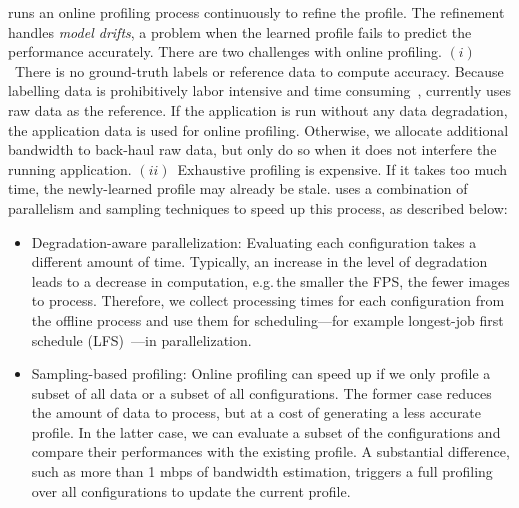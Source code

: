 
 \sysname{} runs an online profiling process
continuously to refine the profile. The refinement handles \textit{model
  drifts}, a problem when the learned profile fails to predict the performance
accurately. There are two challenges with online profiling.
$(i)$~There is no ground-truth labels or reference data to compute
accuracy. Because labelling data is prohibitively labor intensive and time
consuming~\cite{russell2008labelme}, \sysname{} currently uses raw data as the
reference. If the application is run without any data degradation, the
application data is used for online profiling. Otherwise, we allocate additional
bandwidth to back-haul raw data, but only do so when it does not interfere the
running application.
$(ii)$~Exhaustive profiling is expensive. If it takes too much time,
the newly-learned profile may already be stale. \sysname{} uses a combination of
parallelism and sampling techniques to speed up this process, as described below:

\begin{itemize}[leftmargin=*]

\item Degradation-aware parallelization: Evaluating each configuration takes a
different amount of time. Typically, an increase in the level of degradation
leads to a decrease in computation, e.g.\,the smaller the FPS, the fewer images
to process. Therefore, we collect processing times for each configuration from
the offline process and use them for scheduling---for example longest-job first
schedule (LFS)~\cite{karger2010scheduling}---in parallelization.

\item Sampling-based profiling: Online profiling can speed up if we only profile a subset of all data or a subset of all configurations. 
The former case reduces the amount of data to process, but at a cost of generating a less accurate profile. In the latter case, we can evaluate a subset of the configurations and compare their performances with the existing profile. A substantial difference, such as more than 1 mbps of bandwidth estimation, triggers a full profiling over all configurations to update the current profile.

\end{itemize}

